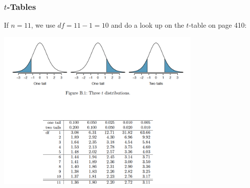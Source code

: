 \documentclass[handout]{beamer}
\newcommand{\xbar}{\overline{x}}
\begin{document}
\begin{frame}
\frametitle{$t$-Tables}
If $n=11$, we use $df=11-1=10$ and do a look up on the $t$-table on page 410:

\begin{center}
\includegraphics[width=0.75\textwidth]{figure/t.png}
\end{center}

\end{frame}


%
%
%
\end{document}
